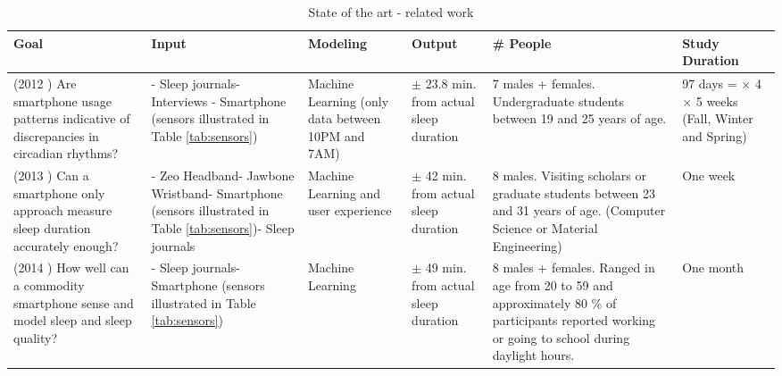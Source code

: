 \documentclass[12pt]{article} %
\begin{document}
\begin{table}[H]
\center
\begin{footnotesize}
	\begin{tabular}{|p{2.2cm} |p{2.5cm} |p{2cm} |p{2.1cm} |p{2.8cm} |p{1.8cm} |}
	\hline
	\textbf{Goal} & \textbf{Input} & \textbf{Modeling} & \textbf{Output} & \textbf{\# People} & \textbf{Study Duration}\\
	\hline
	\hline
	(2012 \cite{beWell}) Are smartphone usage patterns indicative of discrepancies in circadian rhythms? & - Sleep journals\newline - Interviews \newline - Smartphone \newline(sensors illustrated in Table \ref{tab:sensors})  & Machine Learning (only data between 10PM and 7AM) & $\pm$ 23.8 min. from actual \newline sleep \newline duration & 7 males + \newline 2 females. \newline Undergraduate students between 19 and 25 years of age. & 97 days = \newline 5 $\times$ 4 $\times$ 5 weeks (Fall, Winter and Spring)\\
	\hline
	(2013 \cite{compare}) Can a smartphone only approach measure sleep duration accurately enough? & - Zeo Headband\newline - Jawbone \newline Wristband\newline - Smartphone \newline(sensors illustrated in Table \ref{tab:sensors})\newline - Sleep journals & Machine Learning and user experience & $\pm$ 42 min. from actual \newline sleep \newline duration & 8 males. \newline Visiting scholars or graduate students between 23 and 31 years of age. (Computer Science or Material Engineering) & One week \\
	\hline
	(2014 \cite{toss}) How well can a commodity smartphone sense and model sleep and sleep quality? & - Sleep journals\newline - Smartphone \newline(sensors illustrated in Table \ref{tab:sensors}) & Machine Learning & $\pm$ 49 min. from  actual \newline sleep \newline duration & 8 males + \newline 19 females. \newline Ranged in age from 20 to 59 and approximately 80 \% of participants reported working or going to school during daylight hours. & One month \\
	\hline 
	\end{tabular}
	\caption{State of the art - related work}
	\label{tab:tableApproach}
\end{footnotesize}
\end{table}
\end{document}
